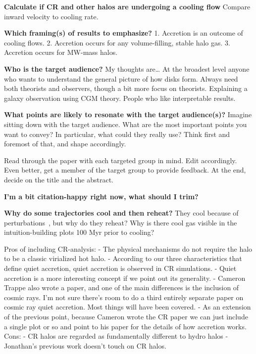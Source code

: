 \documentclass[fleqn,usenatbib]{mnras}
\begin{document}
\textbf{Calculate if CR and other halos are undergoing a cooling flow}
Compare inward velocity to cooling rate.

\textbf{
Which framing(s) of results to emphasize?
}
1. Accretion is an outcome of cooling flows.
2. Accretion occurs for any volume-filling, stable halo gas.
3. Accretion occurs for MW-mass halos.

\textbf{
Who is the target audience?
}
My thoughts are\ldots
At the broadest level anyone who wants to understand the general picture of how disks form.
Always need both theorists and observers, though a bit more focus on theorists.
Explaining a galaxy observation using CGM theory.
People who like interpretable results.

\textbf{What points are likely to resonate with the target audience(s)?}
Imagine sitting down with the target audience.
What are the most important points you want to convey?
In particular, what could they really use?
Think first and foremost of that, and shape accordingly.

Read through the paper with each targeted group in mind.
Edit accordingly.
Even better, get a member of the target group to provide feedback.
At the end, decide on the title and the abstract.

\textbf{I'm a bit citation-happy right now, what should I trim?}

\textbf{Why do some trajectories cool and then reheat?}
They cool because of perturbations~\citep{Esmerian2020}, but why do they reheat?
Why is there cool gas visible in the intuition-building plots 100 Myr prior to cooling?

Pros of including CR-analysis:
- The physical mechanisms do not require the halo to be a classic virialized hot halo.
- According to our three characteristics that define quiet accretion, quiet accretion is observed in CR simulations.
- Quiet accretion is a more interesting concept if we point out its generality.
- Cameron Trappe also wrote a paper, and one of the main differences is the inclusion of cosmic rays. I'm not sure there's room to do a third entirely separate paper on cosmic ray quiet accretion. Most things will have been covered.
- As an extension of the previous point, because Cameron wrote the CR paper we can just include a single plot or so and point to his paper for the details of how accretion works.
Cons:
- CR halos are regarded as fundamentally different to hydro halos
- Jonathan's previous work doesn't touch on CR halos.
\end{document}
